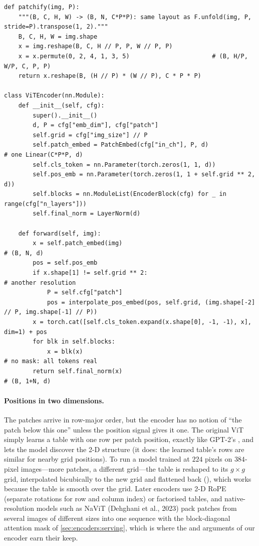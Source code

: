 \begin{lstlisting}[caption={Patchify and the ViT encoder (from \ident{llmsys/vit.py}).},label={lst:encoders:patchify}]
def patchify(img, P):
    """(B, C, H, W) -> (B, N, C*P*P): same layout as F.unfold(img, P, stride=P).transpose(1, 2)."""
    B, C, H, W = img.shape
    x = img.reshape(B, C, H // P, P, W // P, P)
    x = x.permute(0, 2, 4, 1, 3, 5)                       # (B, H/P, W/P, C, P, P)
    return x.reshape(B, (H // P) * (W // P), C * P * P)

class ViTEncoder(nn.Module):
    def __init__(self, cfg):
        super().__init__()
        d, P = cfg["emb_dim"], cfg["patch"]
        self.grid = cfg["img_size"] // P
        self.patch_embed = PatchEmbed(cfg["in_ch"], P, d)               # one Linear(C*P*P, d)
        self.cls_token = nn.Parameter(torch.zeros(1, 1, d))
        self.pos_emb = nn.Parameter(torch.zeros(1, 1 + self.grid ** 2, d))
        self.blocks = nn.ModuleList(EncoderBlock(cfg) for _ in range(cfg["n_layers"]))
        self.final_norm = LayerNorm(d)

    def forward(self, img):
        x = self.patch_embed(img)                                       # (B, N, d)
        pos = self.pos_emb
        if x.shape[1] != self.grid ** 2:                                # another resolution
            P = self.cfg["patch"]
            pos = interpolate_pos_embed(pos, self.grid, (img.shape[-2] // P, img.shape[-1] // P))
        x = torch.cat([self.cls_token.expand(x.shape[0], -1, -1), x], dim=1) + pos
        for blk in self.blocks:
            x = blk(x)                                                  # no mask: all tokens real
        return self.final_norm(x)                                       # (B, 1+N, d)
\end{lstlisting}

\paragraph{Positions in two dimensions.} The patches arrive in row-major order, but the encoder has
no notion of ``the patch below this one'' unless the position signal gives it one. The original ViT
simply learns a table with one row per patch position, exactly like GPT-2's , and lets
the model discover the 2-D structure (it does: the learned table's rows are similar for nearby grid
positions). To run a model trained at $224$ pixels on $384$-pixel images---more patches, a
different grid---the table is reshaped to its $g\times g$ grid, interpolated bicubically to the new
grid and flattened back (), which works because the table is smooth
over the grid. Later encoders use 2-D RoPE (separate rotations for row and column index) or
factorised tables, and native-resolution models such as NaViT (Dehghani et al., 2023) pack patches
from several images of different sizes into one sequence with the block-diagonal attention mask of
\cref{sec:encoders:serving}, which is where the  and 
arguments of our encoder earn their keep.


